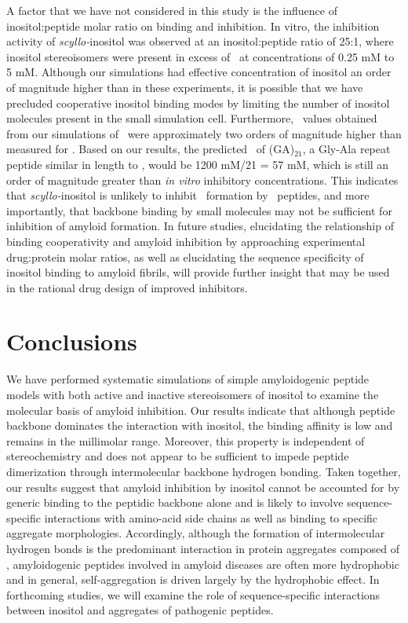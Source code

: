 A factor that we have not considered in this study is the influence of inositol:peptide molar ratio on binding and inhibition. In vitro, the inhibition activity of \textit{scyllo-}inositol was observed at an inositol:peptide ratio of 25:1, where inositol stereoisomers were present in excess of \abeta\ at concentrations of 0.25 mM to 5 mM.\cite{McLaurin:2000p64} Although our simulations had effective concentration of inositol an order of magnitude higher than in these experiments, it is possible that we have precluded cooperative inositol binding modes by limiting the number of inositol molecules present in the small simulation cell. Furthermore, \KD\ values obtained from our simulations of \gafour\ were approximately two orders of magnitude higher than measured for \abeta. Based on our results, the predicted \KD\ of (GA)$_{21}$, a Gly-Ala repeat peptide similar in length to \abeta, would be 1200 mM/21 = 57 mM, which is still an order of magnitude greater than \textit{in vitro} inhibitory concentrations. This indicates that \textit{scyllo-}inositol is unlikely to inhibit \bsheet\ formation by \gafour\ peptides, and more importantly, that backbone binding by small molecules may not be sufficient for inhibition of amyloid formation. In future studies, elucidating the relationship of binding cooperativity and amyloid inhibition by approaching experimental drug:protein molar ratios, as well as elucidating the sequence specificity of inositol binding to amyloid fibrils, will provide further insight that may be used in the rational drug design of improved inhibitors.

\section{Conclusions}
We have performed systematic simulations of simple amyloidogenic peptide models with both active and inactive stereoisomers of inositol to examine the molecular basis of amyloid inhibition. Our results indicate that although peptide backbone dominates the interaction with inositol, the binding affinity is low and remains in the millimolar range. Moreover, this property is independent of stereochemistry and does not appear to be sufficient to impede peptide dimerization through intermolecular backbone hydrogen bonding. Taken together, our results suggest that amyloid inhibition by inositol cannot be accounted for by generic binding to the peptidic backbone alone and is likely to involve sequence-specific interactions with amino-acid side chains as well as binding to specific aggregate morphologies. Accordingly, although the formation of intermolecular hydrogen bonds is the predominant interaction in protein aggregates composed of \gafour, amyloidogenic peptides involved in amyloid diseases are often more hydrophobic and in general, self-aggregation is driven largely by the hydrophobic effect.\cite{Chiti:2006p20} In forthcoming studies, we will examine the role of sequence-specific interactions between inositol and aggregates of pathogenic peptides.

